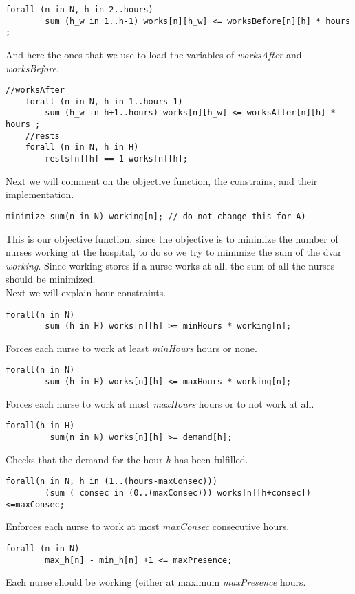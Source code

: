 \documentclass[11pt]{article}
\begin{document}
\begin{lstlisting}[style=OPL]
 	forall (n in N, h in 2..hours)
 		sum (h_w in 1..h-1) works[n][h_w] <= worksBefore[n][h] * hours ;	
\end{lstlisting}
And here the ones that we use to load the variables of \textit{worksAfter} and \textit{worksBefore}.
\begin{lstlisting}[style=OPL]
 	//worksAfter
 	forall (n in N, h in 1..hours-1)
 		sum (h_w in h+1..hours) works[n][h_w] <= worksAfter[n][h] * hours ;	
 	//rests
 	forall (n in N, h in H)
 		rests[n][h] == 1-works[n][h];	
\end{lstlisting}


Next we will comment on the objective function, the constrains, and their implementation.
\begin{lstlisting}[style=OPL]
  minimize sum(n in N) working[n]; // do not change this for A)
\end{lstlisting}
This is our objective function, since the objective is to minimize the number of nurses working at the hospital, to do so we try to minimize the sum of the dvar \textit{working}. Since working stores if a nurse works at all, the sum of all the nurses should be minimized.
\\
Next we will explain hour constraints.
\begin{lstlisting}[style=OPL]
 	forall(n in N)
 	  	sum (h in H) works[n][h] >= minHours * working[n];
\end{lstlisting}
Forces each nurse to work at least \textit{minHours} hours or none.

\begin{lstlisting}[style=OPL] 	
 	forall(n in N)
 	  	sum (h in H) works[n][h] <= maxHours * working[n];
\end{lstlisting}
Forces each nurse to work at most \textit{maxHours} hours or to not work at all.
\begin{lstlisting}[style=OPL]
 	forall(h in H)
 	  	 sum(n in N) works[n][h] >= demand[h];
\end{lstlisting}
Checks that the demand for the hour \textit{h} has been fulfilled.

\begin{lstlisting}[style=OPL]
 	forall(n in N, h in (1..(hours-maxConsec)))
 		(sum ( consec in (0..(maxConsec))) works[n][h+consec])<=maxConsec; 	
\end{lstlisting}
Enforces each nurse to work at most \textit{maxConsec} consecutive hours.

\begin{lstlisting}[style=OPL]
 	forall (n in N)
 		max_h[n] - min_h[n] +1 <= maxPresence;	
\end{lstlisting}
Each nurse should be working (either  at maximum \textit{maxPresence} hours.
\end{document}
